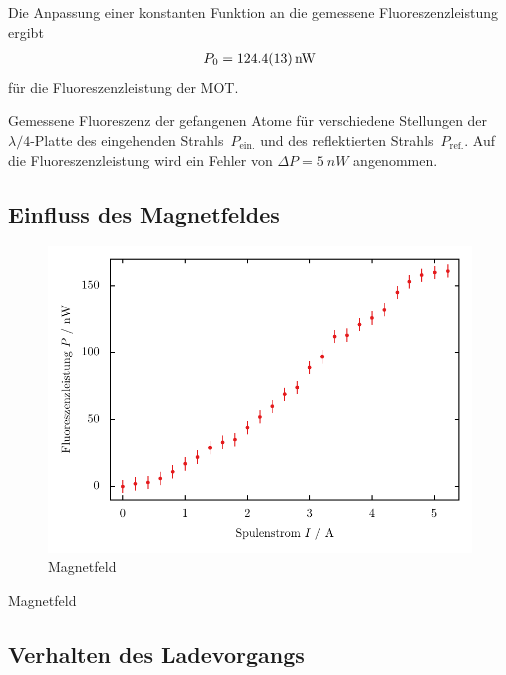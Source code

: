 \documentclass[11pt, a4paper]{article}
\numberwithin{equation}{section}
\begin{document}
Die Anpassung einer konstanten Funktion an die gemessene Fluoreszenzleistung ergibt
\begin{align*}
	P_0 = \SI{124.4 +- 1.3}{nW}
\end{align*}
für die Fluoreszenzleistung der MOT.

\begin{table}
	\centering
	
	\caption{Gemessene Fluoreszenz der gefangenen Atome für verschiedene Stellungen der $\lambda / 4$-Platte des eingehenden Strahls~$P_\mathrm{ein.}$ und des reflektierten Strahls~$P_\mathrm{ref.}$. Auf die Fluoreszenzleistung wird ein Fehler von $\Delta P = \SI{5}{nW}$ angenommen.}
	\label{tab:lambda_4}
\end{table}


\subsection{Einfluss des Magnetfeldes}

\begin{figure}
	\centering
	\includegraphics{./figures/magnetic_field.pdf}
	\caption{Magnetfeld}
\end{figure}

\begin{table}
	\centering
	
	\caption{Magnetfeld}
\end{table}


\subsection{Verhalten des Ladevorgangs}
\end{document}

